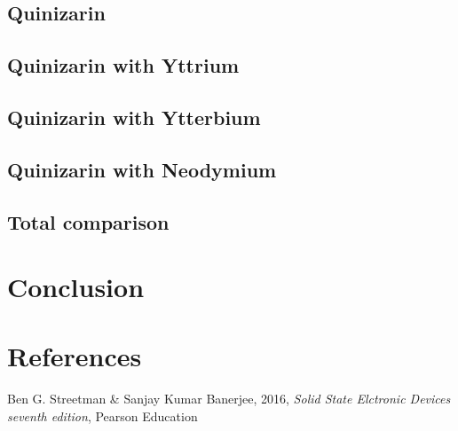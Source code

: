 \documentclass{article}
\begin{document}
  \subsection{Quinizarin}


  \subsection{Quinizarin with Yttrium}


  \subsection{Quinizarin with Ytterbium}


  \subsection{Quinizarin with Neodymium}


  \subsection{Total comparison}




\vspace{1cm}

\section{Conclusion}    \label{sec:Conclusion}


\vspace{1cm}

\section{References} \label{sec:References}

    \begin{thebibliography}{}

    Ben G. Streetman \& Sanjay Kumar Banerjee, 2016, \textit{Solid State Elctronic Devices seventh edition}, Pearson Education


    \end{thebibliography}



\appendix  \label{sec:Appendix}

\iffalse
\end{document}
